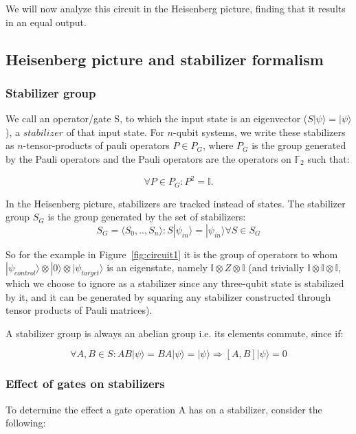 We will now analyze this circuit in the Heisenberg picture,
finding that it results in an equal output.

\subsection{Heisenberg picture and stabilizer formalism}
\subsubsection{Stabilizer group}
We call an operator/gate S, to which the input state is an
eigenvector ($S|\psi\rangle=|\psi\rangle$), a $stabilizer$ of that input state. 
For $n$-qubit systems, we write these stabilizers as $n$-tensor-products 
of pauli operators $P \in P_{G}$,
where $P_{G}$ is the group generated by the Pauli operators and
the Pauli operators are the operators on $\mathbb{F}_{2}$ such that:

\begin{equation}
    \forall P\in P_{G}: P^{2}=\mathbb{I}.
\end{equation}

In the Heisenberg picture, stabilizers are tracked instead of
states. 
The stabilizer group $S_{G}$ is the group generated by
the set of stabilizers:
\begin{equation}
	S_{G} = \langle S_{0},..,S_{n}\rangle: S|\psi_{in}\rangle = 
	|\psi_{in}\rangle \forall S \in S_{G}
\end{equation}

So for the example in Figure~\ref{fig:circuit1} it is the group
of operators to whom
$|\psi_{control}\rangle \otimes |0\rangle \otimes 
|\psi_{target}\rangle$ is an eigenstate, namely 
$\mathbb{I}\otimes Z \otimes \mathbb{I}$ (and trivially
$\mathbb{I}\otimes\mathbb{I}\otimes\mathbb{I}$, which we choose
to ignore as a stabilizer since any three-qubit state
is stabilized by it, and it can be generated by squaring any
stabilizer constructed through tensor products of Pauli matrices).

A stabilizer group is always an abelian group i.e. its elements 
 commute, since if:

\begin{equation}
	\label{abelian_stabilizers_equation}
	\forall A,B \in S: AB|\psi\rangle = BA|\psi\rangle = |\psi\rangle
	\Rightarrow [A,B]|\psi\rangle=0
\end{equation}

\subsubsection{Effect of gates on stabilizers}
To determine the effect a gate operation A has on a
stabilizer, consider the following:

